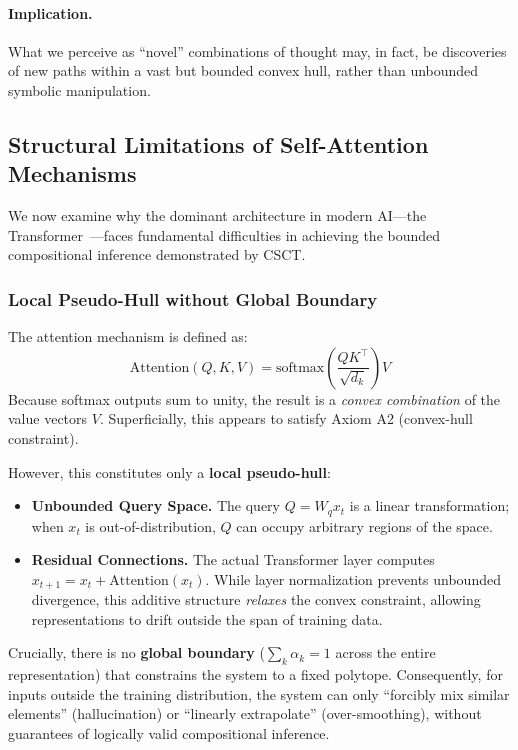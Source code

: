 \documentclass{article}
\begin{document}
\paragraph{Implication.}
What we perceive as ``novel'' combinations of thought may, in fact, be discoveries of new paths within a vast but bounded convex hull, rather than unbounded symbolic manipulation.

\subsection{Structural Limitations of Self-Attention Mechanisms}

We now examine why the dominant architecture in modern AI---the Transformer~\cite{vaswani2017attention}---faces fundamental difficulties in achieving the bounded compositional inference demonstrated by CSCT.

\subsubsection{Local Pseudo-Hull without Global Boundary}

The attention mechanism is defined as:
\begin{equation}
    \text{Attention}(Q, K, V) = \text{softmax}\left(\frac{QK^\top}{\sqrt{d_k}}\right) V
\end{equation}
Because softmax outputs sum to unity, the result is a \emph{convex combination} of the value vectors $V$.
Superficially, this appears to satisfy Axiom A2 (convex-hull constraint).

However, this constitutes only a \textbf{local pseudo-hull}:
\begin{itemize}
    \item \textbf{Unbounded Query Space.} The query $Q = W_q x_t$ is a linear transformation; when $x_t$ is out-of-distribution, $Q$ can occupy arbitrary regions of the space.
    \item \textbf{Residual Connections.} The actual Transformer layer computes $x_{t+1} = x_t + \text{Attention}(x_t)$. While layer normalization prevents unbounded divergence, this additive structure \emph{relaxes} the convex constraint, allowing representations to drift outside the span of training data.
\end{itemize}

Crucially, there is no \textbf{global boundary} ($\sum_k \alpha_k = 1$ across the entire representation) that constrains the system to a fixed polytope.
Consequently, for inputs outside the training distribution, the system can only ``forcibly mix similar elements'' (hallucination) or ``linearly extrapolate'' (over-smoothing), without guarantees of logically valid compositional inference.
\end{document}
